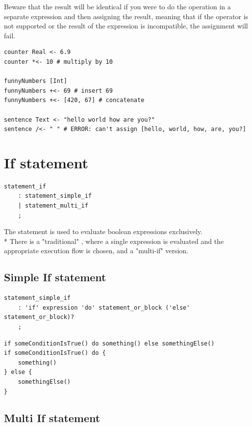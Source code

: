 Beware that the result will be identical if you were to do the operation in a
separate expression and then assigning the result, meaning that if the operator
is not supported or the result of the expression is incompatible, the
assignment will fail.

\begin{verbatim}
counter Real <- 6.9
counter *<- 10 # multiply by 10

funnyNumbers [Int]
funnyNumbers +<- 69 # insert 69
funnyNumbers +<- [420, 67] # concatenate

sentence Text <- "hello world how are you?"
sentence /<- " " # ERROR: can't assign [hello, world, how, are, you?]
\end{verbatim}

\clearpage

\section{If statement}

\begin{verbatim}
statement_if
	: statement_simple_if
	| statement_multi_if
	;
\end{verbatim}

The  statement is used to evaluate boolean expressions exclusively.\\*
There is a "traditional" , where a single expression is evaluated and
the appropriate execution flow is chosen, and a "multi-if" version.

\subsection{Simple If statement}

\begin{verbatim}
statement_simple_if
	: 'if' expression 'do' statement_or_block ('else' statement_or_block)?
	;
\end{verbatim}

\begin{verbatim}
if someConditionIsTrue() do something() else somethingElse()
if someConditionIsTrue() do {
	something()
} else {
	somethingElse()
}
\end{verbatim}

\subsection{Multi If statement}

